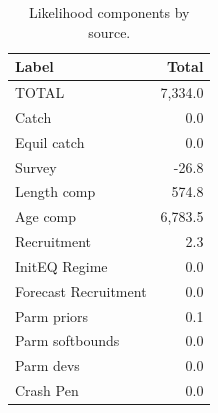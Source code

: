 \documentclass[
]{scrartcl}
\begin{document}
\endgroup

\newpage{}

\begingroup
\fontsize{9.0pt}{10.8pt}\selectfont

\begin{longtable}{lr}

\caption{\label{tbl-likes}Likelihood components by source.}

\tabularnewline

\toprule
Label & Total \\ 
\midrule\addlinespace[2.5pt]
TOTAL & 7,334.0 \\ 
Catch & 0.0 \\ 
Equil catch & 0.0 \\ 
Survey & -26.8 \\ 
Length comp & 574.8 \\ 
Age comp & 6,783.5 \\ 
Recruitment & 2.3 \\ 
InitEQ Regime & 0.0 \\ 
Forecast Recruitment & 0.0 \\ 
Parm priors & 0.1 \\ 
Parm softbounds & 0.0 \\ 
Parm devs & 0.0 \\ 
Crash Pen & 0.0 \\ 
\bottomrule

\end{longtable}

\endgroup

\newpage{}

\begingroup
\fontsize{9.0pt}{10.8pt}\selectfont
\end{document}
